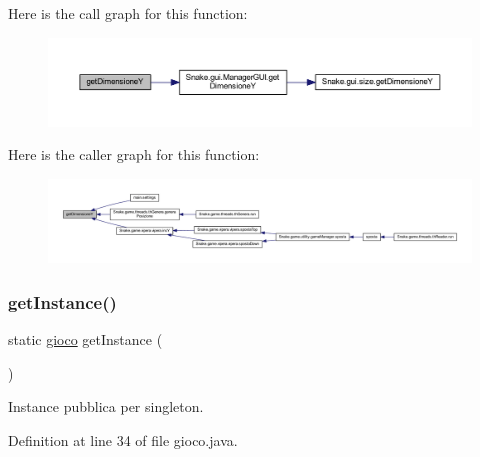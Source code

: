 Here is the call graph for this function\+:
\nopagebreak
\begin{figure}[H]
\begin{center}
\leavevmode
\includegraphics[width=350pt]{class_snake_1_1game_1_1gioco_abd35efad25c3e2eb4a53c1a7e2b11d71_cgraph}
\end{center}
\end{figure}
Here is the caller graph for this function\+:
\nopagebreak
\begin{figure}[H]
\begin{center}
\leavevmode
\includegraphics[width=350pt]{class_snake_1_1game_1_1gioco_abd35efad25c3e2eb4a53c1a7e2b11d71_icgraph}
\end{center}
\end{figure}
\mbox{\label{class_snake_1_1game_1_1gioco_aeab124c2ec716095907dd38891f8163d}} 
\subsubsection{\texorpdfstring{get\+Instance()}{getInstance()}}
{\footnotesize\ttfamily static \mbox{\hyperlink{class_snake_1_1game_1_1gioco}{gioco}} get\+Instance (\begin{DoxyParamCaption}{ }\end{DoxyParamCaption})\hspace{0.3cm}{\ttfamily [static]}}



Instance pubblica per singleton. 



Definition at line 34 of file gioco.\+java.

